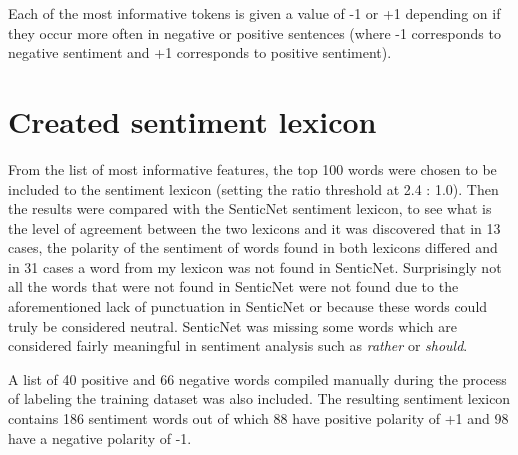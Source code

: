 Each of the most informative tokens is given a value of -1 or +1 depending on if they occur more often in negative or positive sentences (where -1 corresponds to negative sentiment and  +1 corresponds to positive sentiment). 

\section{Created sentiment lexicon}
From the list of most informative features, the top 100 words were chosen to be included to the sentiment lexicon (setting the ratio threshold at 2.4 : 1.0). 
Then the results were compared with the SenticNet sentiment lexicon, to see what is the level of agreement between the two lexicons and it was discovered that in 13 cases, the polarity of the sentiment of words found in both lexicons differed and in 31 cases a word from my lexicon was not found in SenticNet. Surprisingly not all the words that were not found in SenticNet were not found due to the aforementioned lack of punctuation in SenticNet or because these words could truly be considered neutral. SenticNet was missing some words which are considered fairly meaningful in sentiment analysis such as \textit{rather} or \textit{should}.

A list of 40 positive and 66 negative words compiled manually during the process of labeling the training dataset was also included. The resulting sentiment lexicon contains 186 sentiment words out of which 88 have positive polarity of +1 and 98 have a negative polarity of -1.



